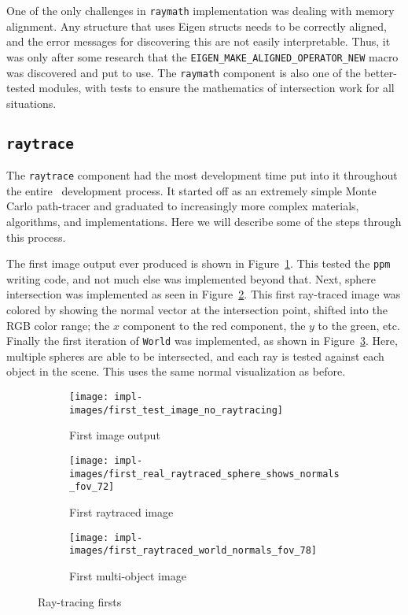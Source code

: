 One of the only challenges in \texttt{raymath} implementation was dealing with memory alignment.
Any structure that uses Eigen structs needs to be correctly aligned, and the error messages for discovering this are not easily interpretable.
Thus, it was only after some research that the \texttt{EIGEN\_MAKE\_ALIGNED\_OPERATOR\_NEW} macro was discovered and put to use.
The \texttt{raymath} component is also one of the better-tested modules, with tests to ensure the mathematics of intersection work for all situations.

\subsection{\texttt{raytrace}}\label{ch:implementation:prototype:raytrace}

The \texttt{raytrace} component had the most development time put into it throughout the entire \name\ development process.
It started off as an extremely simple Monte Carlo path-tracer and graduated to increasingly more complex materials, algorithms, and implementations.
Here we will describe some of the steps through this process.

The first image output ever produced is shown in Figure~\ref{fig:rayterm-cpu_ppm_output_first}.
This tested the \texttt{ppm} writing code, and not much else was implemented beyond that.
Next, sphere intersection was implemented as seen in Figure~\ref{fig:rayterm-cpu_first_raytraced_image}.
This first ray-traced image was colored by showing the normal vector at the intersection point, shifted into the RGB color range; the $x$ component to the red component, the $y$ to the green, etc.
Finally the first iteration of \texttt{World} was implemented, as shown in Figure~\ref{fig:rayterm-cpu_first_multiobject_raytraced_image}.
Here, multiple spheres are able to be intersected, and each ray is tested against each object in the scene.
This uses the same normal visualization as before.


\vspace{0.3em}
\begin{figure}[htb]
  \centering
  \begin{subfigure}[htb]{0.2\textwidth}
    \texttt{[image: impl-images/first\_test\_image\_no\_raytracing]}
    \caption{First image output}
    \label{fig:rayterm-cpu_ppm_output_first}
  \end{subfigure}
  \begin{subfigure}[htb]{0.35\textwidth}
    \texttt{[image: impl-images/first\_real\_raytraced\_sphere\_shows\_normals\_fov\_72]}
    \caption{First raytraced image}
    \label{fig:rayterm-cpu_first_raytraced_image}
  \end{subfigure}
  \begin{subfigure}[htb]{0.4\textwidth}
    \centering
    \texttt{[image: impl-images/first\_raytraced\_world\_normals\_fov\_78]}
    \caption{First multi-object image}
    \label{fig:rayterm-cpu_first_multiobject_raytraced_image}
  \end{subfigure}
  \caption{Ray-tracing firsts}
  \label{fig:rayterm-cpu_firsts}
\end{figure}

